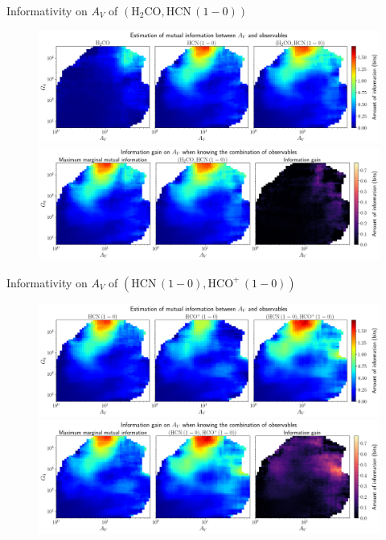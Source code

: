 \documentclass{beamer}
\begin{document}
\begin{frame}{Informativity on $A_V$ of $\left(\mathrm{H_2CO},\mathrm{HCN\,(1-0)}\right)$}
    \begin{figure}
        \centering
        \includegraphics[width=0.95\linewidth]{../mi/av__h2co_hcn10_mi.png}
        \vfill
        \includegraphics[width=0.95\linewidth]{../mi/av__h2co_hcn10_mi_gain.png}
    \end{figure}
\end{frame}

\begin{frame}{Informativity on $A_V$ of $\left(\mathrm{HCN\,(1-0)},\mathrm{HCO^+\,(1-0)}\right)$}
    \begin{figure}
        \centering
        \includegraphics[width=0.95\linewidth]{../mi/av__hcn10_hcop10_mi.png}
        \vfill
        \includegraphics[width=0.95\linewidth]{../mi/av__hcn10_hcop10_mi_gain.png}
    \end{figure}
\end{frame}
\end{document}

